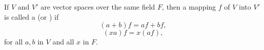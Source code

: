 If $V$ and $V'$ are vector spaces over the same field $F$, then a mapping $f$ of $V$ into $V'$ is called a  (or ) if
$$
(a+b)f = af + bf,
$$
$$
(xa)f = x(af),
$$
for all $a, b$ in $V$ and all $x$ in $F$.
